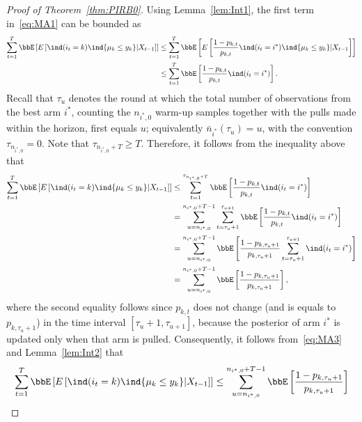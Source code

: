 \documentclass[11pt]{article}
\begin{document}
\begin{proof}[Proof of Theorem~\ref{thm:PIRB0}]
    Using Lemma~\ref{lem:Int1}, the first term in~\eqref{eq:MA1} can be bounded as
    \begin{align}
        \nonumber
      \sum_{t=1}^{T} \bbE \left[ E\left[  \ind(i_t=k )  \ind\{\mu_k \leq y_k  \}  | X_{t-1}  \right] \right] &\leq \sum_{t=1}^{T} \bbE \left[ E\left[  \frac{1-p_{k,t}}{p_{k,t}} \ind(i_t=i^* )  \ind\{\mu_k \leq y_k  \}  | X_{t-1}  \right] \right]
      \\
      &\leq \sum_{t=1}^{T} \bbE \left[   \frac{1-p_{k,t}}{p_{k,t}} \ind(i_t=i^* )   \right].
    \end{align}
    Recall that $\tau_u$ denotes the round at which the total number of observations from the best arm $i^*$, counting the $n_{i^*,0}$ warm-up samples together with the pulls made within the horizon, first equals $u$; equivalently $\bar n_{i^*}(\tau_u) = u$, with the convention $\tau_{n_{i^*,0}} = 0$. Note that $\tau_{n_{i^*,0}+T} \geq T$. Therefore, it follows from the inequality above that
    \begin{align}
        \nonumber
      \sum_{t=1}^{T} \bbE \left[ E\left[  \ind(i_t=k )  \ind\{\mu_k \leq y_k  \}  | X_{t-1}  \right] \right] &\leq \sum_{t=1}^{\tau_{n_{i^*,0}+T}} \bbE \left[   \frac{1-p_{k,t}}{p_{k,t}} \ind(i_t=i^* )   \right]
      \\
      \nonumber
      &= \sum_{u=n_{i^*,0}}^{n_{i^*,0}+T-1} \sum_{t=\tau_{u}+1}^{\tau_{u+1}}  \bbE \left[   \frac{1-p_{k,t}}{p_{k,t}}  \ind(i_t=i^* )   \right]
      \\ 
      &= \sum_{u=n_{i^*,0}}^{n_{i^*,0}+T-1}  \bbE \left[   \frac{1-p_{k,\tau_{u}+1}}{p_{k,\tau_{u}+1}}  \sum_{t=\tau_{u}+1}^{\tau_{u+1}}  \ind(i_t=i^* )   \right]
      \nonumber
      \\
      &= \sum_{u=n_{i^*,0}}^{n_{i^*,0}+T-1}  \bbE \left[   \frac{1-p_{k,\tau_{u}+1}}{p_{k,\tau_{u}+1}}     \right] ,
      \label{eq:MA3}
    \end{align}
    where the second equality follows since $p_{k,t}$ does not change (and is equals to $p_{k,\tau_{u}+1}$) in the time interval $[\tau_{u}+1,\tau_{u+1}]$, because the posterior of arm $i^*$ is updated only when that arm is pulled. Consequently, it follows from~\eqref{eq:MA3} and Lemma~\ref{lem:Int2} that
   \begin{align}
    \nonumber
    \sum_{t=1}^{T} \bbE \left[ E\left[  \ind(i_t=k )  \ind\{\mu_k \leq y_k  \}  | X_{t-1}  \right] \right] &\leq \sum_{u=n_{i^*,0}}^{n_{i^*,0}+T-1}  \bbE \left[   \frac{1-p_{k,\tau_{u}+1}}{p_{k,\tau_{u}+1}}     \right] 
    \\

\end{align}
\end{proof}
\end{document}

